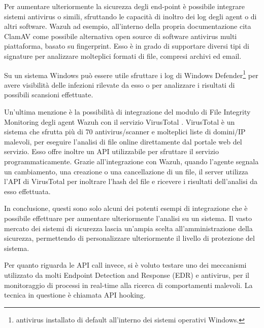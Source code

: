 \medskip


Per aumentare ulteriormente la sicurezza degli end-point è possibile integrare sistemi antivirus o simili, sfruttando le capacità di inoltro dei log degli agent o di altri software.  Wazuh ad esempio, all'interno della propria documentazione cita ClamAV \cite{clamav} come possibile alternativa open source di software antivirus multi piattaforma, basato su fingerprint. Esso è in grado di supportare diversi tipi di signature per analizzare molteplici formati di file, compresi archivi ed email.

Su un sistema Windows può essere utile sfruttare i log di Windows Defender\footnote{antivirus installato di default all'interno dei sistemi operativi Windows.} per avere visibilità delle infezioni rilevate da esso o per analizzare i risultati di possibili scansioni effettuate.

Un'ultima menzione è la possibilità di integrazione del modulo di File Integrity Monitoring degli agent Wazuh con il servizio VirusTotal \cite{virustotal}. VirusTotal è un sistema che sfrutta più di 70 antivirus/scanner e molteplici liste di domini/IP malevoli, per eseguire l'analisi di file online direttamente dal portale web del servizio. Esso offre inoltre un API utilizzabile per sfruttare il servizio programmaticamente. Grazie all'integrazione con Wazuh, quando l'agente segnala un cambiamento, una creazione o una cancellazione di un file, il server  utilizza l'API di VirusTotal per inoltrare l'hash del file e ricevere i risultati dell'analisi da esso effettuata.

In conclusione, questi sono solo alcuni dei potenti esempi di integrazione che è possibile effettuare per aumentare ulteriormente l'analisi su un sistema. Il vasto mercato dei sistemi di sicurezza lascia un'ampia scelta all'amministrazione della sicurezza, permettendo di personalizzare ulteriormente il livello di protezione del sistema.


\medskip

 
\label{apihooking}
Per quanto riguarda le API call invece, si è voluto testare  uno dei meccanismi utilizzato da molti  Endpoint Detection and Response (EDR) e antivirus, per il monitoraggio di  processi in real-time alla ricerca di comportamenti malevoli.  
La tecnica in questione è chiamata API hooking. 

